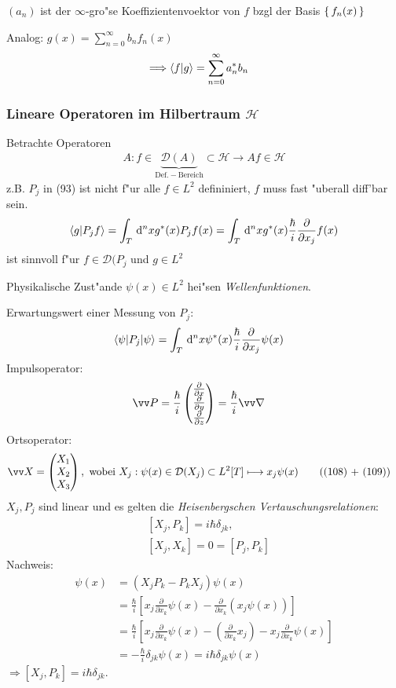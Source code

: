 \documentclass[a4paper]{scrartcl}
\newcommand{\dd}{\ensuremath \, \mathrm{d}}
\newcommand{\matr}[1]{\begin{pmatrix} #1 \end{pmatrix}}
\begin{document}
{$(a_n)$ ist  der $\infty$-gro"se Koeffizientenvoektor von $f$ bzgl der Basis $\set{ f_n(x) }$

Analog: $g(x) = \sum_{n=0}^\infty b_n f_n(x)$
\begin{align}
\Longrightarrow \braket{f | g} & = \sum_{n=0}^\infty a_n^* b_n
\end{align}

\subsubsection*{Lineare Operatoren im Hilbertraum $\mathcal H$}
Betrachte Operatoren
\begin{align}
A: f \in \underbrace{\mathcal D(A)}_{\mathrm{Def.-Bereich}} \subset \mathcal H \longrightarrow A f \in \mathcal{H} 
\end{align}
z.B. $P_j$ in (93) ist nicht f"ur alle $f \in L^2$ defininiert, $f$ muss fast "uberall diff'bar sein.
$$\braket{g | P_j f} = \int_T \dd^n x g^*(x) P_jf(x) = \int_T \dd^n x g^*(x) \frac \hbar i \frac \partial{\partial x_j} f(x)$$
ist sinnvoll f"ur $f \in \mathcal D(P_j$ und $g \in L^2$

Physikalische Zust"ande $\psi(x) \in L^2$ hei"sen \emph{Wellenfunktionen}.

Erwartungswert einer Messung von $P_j$:
\begin{align}
\braket{ \psi | P_j | \psi} & = \int_T \dd^nx \psi^*(x) \frac{\hbar}{i} \frac \partial {\partial x_j} \psi(x)
\end{align}
Impulsoperator:
\begin{align}
\vv P & = \frac \hbar i \matr{ \frac \partial {\partial x} \\ \frac \partial {\partial y} \\ \frac \partial {\partial z}} = \frac \hbar i \vv \nabla
\end{align}
Ortsoperator:
\begin{align}
\vv X & = \matr{ X_1 \\ X_2 \\ X_3 }, \mathrm{ \ wobei \ }
X_j: \psi(x) \in \mathcal D (X_j) \subset L^2[T] \longmapsto x_j \psi(x) \tag{(108) + (109)}
\end{align}
\setcounter{equation}{109}
$X_j, P_j$ sind linear und es gelten die \emph{Heisenbergschen Vertauschungsrelationen}:
\begin{eqnarray}
& \left[ X_j, P_k \right]  = i\hbar \delta_{jk}, \\
& \left[ X_j, X_k \right]  = 0 = [ P_j, P_k ]
\end{eqnarray}
Nachweis:
\begin{align*}
[ X_j, P_k] \psi(x) &= (X_j P_k - P_k X_j) \psi(x) \\
& = \frac \hbar i \left[ x_j \frac \partial {\partial x_k} \psi(x) - \frac \partial {\partial x_k} (x_j \psi(x)) \right] \\
& = \frac \hbar i \left[ x_j \frac \partial {\partial x_k} \psi(x) - {\left( \frac \partial {\partial x_k} x_j \right)} - x_j \frac \partial {\partial x_k} \psi(x) \right] \\
& = - \frac \hbar i \delta_{jk} \psi(x) = i \hbar \delta_{jk} \psi(x)
\end{align*}
$\Longrightarrow [X_j, P_k] = i \hbar \delta_{jk}$.

}
\end{document}
